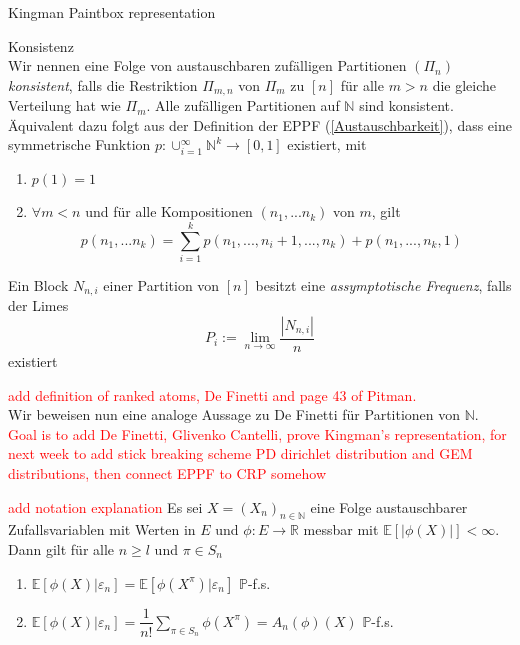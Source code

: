 \begin{section}{Kingman Paintbox representation}
\begin{Definition}{Konsistenz}\\
    Wir nennen eine Folge von austauschbaren zufälligen Partitionen $(\Pi_n)$ \textit{konsistent}, falls die Restriktion $\Pi_{m,n}$ von $\Pi_m$ zu $[n]$ für alle $m > n$ die gleiche Verteilung hat wie $\Pi_m$. Alle zufälligen Partitionen auf $\mathbb{N}$ sind konsistent.
    Äquivalent dazu folgt aus der Definition der EPPF (\ref{Austauschbarkeit}), dass eine symmetrische Funktion  $p: \cup_{i=1}^{\infty} \mathbb{N}^k \to [0,1]$ existiert, mit 
    \begin{enumerate}
        \item $p(1) = 1$
        \item $\forall m < n$ und für alle Kompositionen $(n_1,...n_k)$ von $m$, gilt 
        \[ 
        p(n_1, ... n_k) = \sum_{i=1}^{k}p(n_1, ..., n_i + 1, ..., n_k) + p(n_1,...,n_k,1)
        \]
    \end{enumerate}
\end{Definition}
\begin{Definition}
    Ein Block $N_{n,i}$ einer Partition von $[n]$ besitzt eine \textit{assymptotische Frequenz}, falls der Limes 
    \[
    P_i := \lim_{n \to \infty}\frac{|N_{n,i}|}{n}
    \] 
    existiert
\end{Definition}
\textcolor{red}{add definition of ranked atoms,  De Finetti and page 43 of Pitman.}
\\
Wir beweisen nun eine analoge Aussage zu De Finetti für Partitionen von $\mathbb{N}$.
\textcolor{red}{Goal is to add De Finetti, Glivenko Cantelli, prove Kingman's representation, for next week to add stick breaking scheme PD dirichlet distribution and GEM distributions, then connect EPPF to CRP somehow}
\begin{lemma}
    \cite[Lemma 8.11]{NeiningerHS}
    \label{exchangeable expectations}
    \textcolor{red}{add notation explanation}
    Es sei $X = (X_{n})_{n \in \mathbb{N}}$ eine Folge austauschbarer Zufallsvariablen mit Werten in $E$ und $\phi: E \to \mathbb{R}$ messbar mit $\mathbb{E}[|\phi(X)|]< \infty$. Dann gilt für alle $n \geq l$ und $\pi \in S_n$
    \begin{enumerate}
        \item $ \mathbb{E}[\phi(X)|\varepsilon_n] =\mathbb{E}[\phi(X^\pi)|\varepsilon_n]  $  $\mathbb{P}$-f.s.
        \item $ \mathbb{E}[\phi(X)|\varepsilon_n] = \dfrac{1}{n!}\sum_{\pi \in S_n} \phi(X^\pi) = A_n(\phi)(X)$ $\mathbb{P}$-f.s.

\end{enumerate}
\end{lemma}
\end{section}
